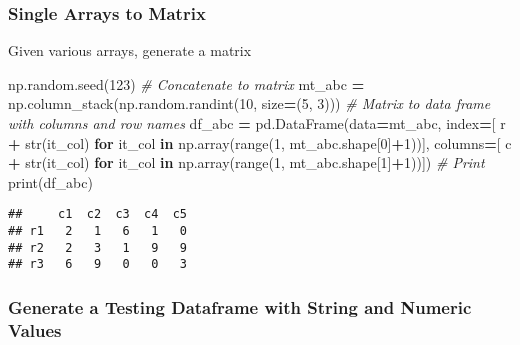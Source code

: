\documentclass[
]{book}
\newenvironment{Shaded}{\begin{snugshade}}{\end{snugshade}}
\newcommand{\BuiltInTok}[1]{#1}
\newcommand{\CommentTok}[1]{\textcolor[rgb]{0.56,0.35,0.01}{\textit{#1}}}
\newcommand{\ControlFlowTok}[1]{\textcolor[rgb]{0.13,0.29,0.53}{\textbf{#1}}}
\newcommand{\DecValTok}[1]{\textcolor[rgb]{0.00,0.00,0.81}{#1}}
\newcommand{\KeywordTok}[1]{\textcolor[rgb]{0.13,0.29,0.53}{\textbf{#1}}}
\newcommand{\NormalTok}[1]{#1}
\newcommand{\OperatorTok}[1]{\textcolor[rgb]{0.81,0.36,0.00}{\textbf{#1}}}
\newcommand{\StringTok}[1]{\textcolor[rgb]{0.31,0.60,0.02}{#1}}
\begin{document}
\hypertarget{single-arrays-to-matrix}{%
\subsubsection{Single Arrays to Matrix}\label{single-arrays-to-matrix}}

Given various arrays, generate a matrix

\begin{Shaded}
\begin{Highlighting}[]
\NormalTok{np.random.seed(}\DecValTok{123}\NormalTok{)}
\CommentTok{\# Concatenate to matrix}
\NormalTok{mt\_abc }\OperatorTok{=}\NormalTok{ np.column\_stack(np.random.randint(}\DecValTok{10}\NormalTok{, size}\OperatorTok{=}\NormalTok{(}\DecValTok{5}\NormalTok{, }\DecValTok{3}\NormalTok{)))}
\CommentTok{\# Matrix to data frame with columns and row names}
\NormalTok{df\_abc }\OperatorTok{=}\NormalTok{ pd.DataFrame(data}\OperatorTok{=}\NormalTok{mt\_abc,}
\NormalTok{            index}\OperatorTok{=}\NormalTok{[ }\StringTok{\textquotesingle{}r\textquotesingle{}} \OperatorTok{+} \BuiltInTok{str}\NormalTok{(it\_col) }\ControlFlowTok{for}\NormalTok{ it\_col }\KeywordTok{in}\NormalTok{ np.array(}\BuiltInTok{range}\NormalTok{(}\DecValTok{1}\NormalTok{, mt\_abc.shape[}\DecValTok{0}\NormalTok{]}\OperatorTok{+}\DecValTok{1}\NormalTok{))],}
\NormalTok{            columns}\OperatorTok{=}\NormalTok{[ }\StringTok{\textquotesingle{}c\textquotesingle{}} \OperatorTok{+} \BuiltInTok{str}\NormalTok{(it\_col) }\ControlFlowTok{for}\NormalTok{ it\_col }\KeywordTok{in}\NormalTok{ np.array(}\BuiltInTok{range}\NormalTok{(}\DecValTok{1}\NormalTok{, mt\_abc.shape[}\DecValTok{1}\NormalTok{]}\OperatorTok{+}\DecValTok{1}\NormalTok{))])}
\CommentTok{\# Print}
\BuiltInTok{print}\NormalTok{(df\_abc)}
\end{Highlighting}
\end{Shaded}

\begin{verbatim}
##     c1  c2  c3  c4  c5
## r1   2   1   6   1   0
## r2   2   3   1   9   9
## r3   6   9   0   0   3
\end{verbatim}

\hypertarget{generate-a-testing-dataframe-with-string-and-numeric-values}{%
\subsubsection{Generate a Testing Dataframe with String and Numeric Values}\label{generate-a-testing-dataframe-with-string-and-numeric-values}}
\end{document}
